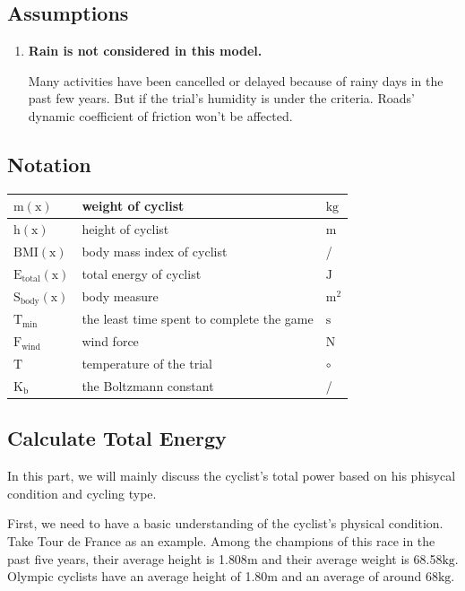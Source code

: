 \documentclass{article}
\begin{document}
	\subsection{Assumptions}
	\begin{enumerate}
		\item	\textbf{Rain is not considered in this model.}

				Many activities have been cancelled or delayed because of rainy days in the past few years. But if the trial's humidity is under the criteria. Roads' dynamic coefficient of friction won't be affected.
	\end{enumerate}
	\subsection{Notation}
	\begin{tabular}{|l|l|l|}
		\hline
		$\mathrm{m}(\mathrm{x})$&weight of cyclist&$\mathrm{kg}$\\
		\hline
		$\mathrm{h}(\mathrm{x})$&height of cyclist&$\mathrm{m}$\\
		\hline
		$\mathrm{BMI}(\mathrm{x})$&body mass index of cyclist&/\\
		\hline
		$\mathrm{E}_\mathrm{total} (\mathrm{x})$&total energy of cyclist&$\mathrm{J}$\\
		\hline
		$\mathrm{S}_\mathrm{body}(\mathrm{x})$&body measure&$\mathrm{m}^2$\\
		\hline
		$\mathrm{T}_\mathrm{min}$&the least time spent to complete the game&$\mathrm{s}$\\
		\hline
		$\mathrm{F}_\mathrm{wind}$&wind force&$\mathrm{N}$\\
		\hline
		$\mathrm{T}$&temperature of the trial&$\circ$\\
		\hline
		$\mathrm{K}_\mathrm{b}$&the Boltzmann constant&/\\
		\hline
	\end{tabular}
	\subsection{Calculate Total Energy}
	In this part, we will mainly discuss the cyclist's total power based on his phisycal condition and cycling type.

	First, we need to have a basic understanding of the cyclist's physical condition. Take Tour de France as an example\cite{france}. Among the champions of this race in the past five years, their average height is 1.808$\mathrm{m}$ and their average weight is 68.58$\mathrm{kg}$. Olympic cyclists have an average height of 1.80$\mathrm{m}$ and an average of around 68$\mathrm{kg}$\cite{weight}.
\end{document}
